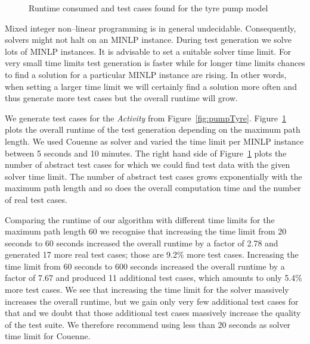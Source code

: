 \documentclass[runningheads,a4paper]{llncs}%
\newcommand{\UMLType}[1]{\textsf{\textit{#1}}} %
\begin{document}
\begin{figure}
%
\caption{Runtime consumed and test cases found for the tyre pump model%
}%
\label{fig:ExplodingTyresRuntime}%
\end{figure}%
Mixed integer non--linear programming is in general undecidable. Consequently,
solvers might not halt on an MINLP instance. During test generation we solve
lots of MINLP instances. It is advisable to set a suitable solver time limit.
For very small time limits test generation is faster while for longer time
limits chances to find a solution for a particular MINLP instance are rising. In
other words, when setting a larger time limit we will certainly find a solution
more often and thus generate more test cases but the overall runtime will grow.

We generate test cases for the \UMLType{Activity} from
Figure~\ref{fig:pumpTyre}.
Figure~\ref{fig:ExplodingTyresRuntime} plots the overall runtime of the test
generation depending on the maximum path length. We used Couenne as solver and
varied the time limit per MINLP instance between 5 seconds and 10 minutes. The
right hand side of Figure~\ref{fig:ExplodingTyresRuntime} plots the number of
abstract test cases for which we could find test data with the given solver time
limit. The number of abstract test cases grows exponentially with the maximum
path length and so does the overall computation time and the number of real test
cases.

Comparing the runtime of our algorithm with different time limits for the
maximum path length 60 we recognise that increasing the time limit from 20
seconds to 60 seconds increased the overall runtime by a factor of 2.78 and
generated 17 more real test cases; those are 9.2\% more test cases. Increasing
the time limit from 60 seconds to 600 seconds increased the overall runtime by a
factor of 7.67 and produced 11 additional test cases, which amounts to only
5.4\% more test cases. We see that increasing the time limit for the solver
massively increases the overall runtime, but we gain only very few additional
test cases for that and we doubt that those additional test cases massively
increase the quality of the test suite. We therefore recommend using less than
20 seconds as solver time limit for Couenne.
\end{document}
